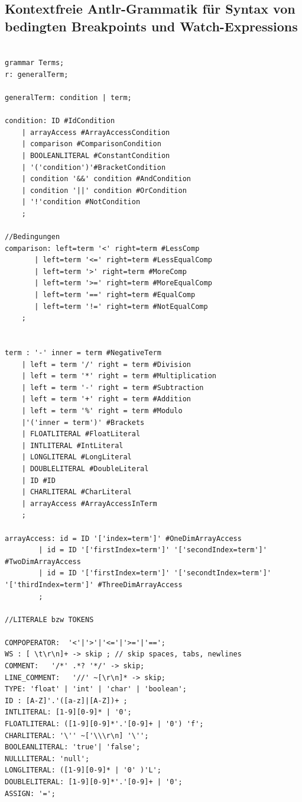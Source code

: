 \documentclass[parskip=full]{scrartcl}
\begin{document}
\subsection{Kontextfreie Antlr-Grammatik für Syntax von bedingten Breakpoints und Watch-Expressions}
\begin{verbatim}

grammar Terms;
r: generalTerm;

generalTerm: condition | term;

condition: ID #IdCondition
	| arrayAccess #ArrayAccessCondition
	| comparison #ComparisonCondition
	| BOOLEANLITERAL #ConstantCondition
	| '('condition')'#BracketCondition
	| condition '&&' condition #AndCondition
	| condition '||' condition #OrCondition
	| '!'condition #NotCondition
	;
	
//Bedingungen
comparison: left=term '<' right=term #LessComp
	   | left=term '<=' right=term #LessEqualComp
	   | left=term '>' right=term #MoreComp
	   | left=term '>=' right=term #MoreEqualComp
	   | left=term '==' right=term #EqualComp
	   | left=term '!=' right=term #NotEqualComp
	;


term : '-' inner = term #NegativeTerm
    | left = term '/' right = term #Division
	| left = term '*' right = term #Multiplication
	| left = term '-' right = term #Subtraction
	| left = term '+' right = term #Addition
	| left = term '%' right = term #Modulo
	|'('inner = term')' #Brackets
	| FLOATLITERAL #FloatLiteral
	| INTLITERAL #IntLiteral
	| LONGLITERAL #LongLiteral
	| DOUBLELITERAL #DoubleLiteral
	| ID #ID
	| CHARLITERAL #CharLiteral
	| arrayAccess #ArrayAccessInTerm
	;

arrayAccess: id = ID '['index=term']' #OneDimArrayAccess
		| id = ID '['firstIndex=term']' '['secondIndex=term']' #TwoDimArrayAccess
		| id = ID '['firstIndex=term']' '['secondtIndex=term']' '['thirdIndex=term']' #ThreeDimArrayAccess
		;

//LITERALE bzw TOKENS

COMPOPERATOR:  '<'|'>'|'<='|'>='|'==';
WS : [ \t\r\n]+ -> skip ; // skip spaces, tabs, newlines
COMMENT:   '/*' .*? '*/' -> skip;
LINE_COMMENT:   '//' ~[\r\n]* -> skip;
TYPE: 'float' | 'int' | 'char' | 'boolean';
ID : [A-Z]'.'([a-z]|[A-Z])+ ;
INTLITERAL: [1-9][0-9]* | '0';
FLOATLITERAL: ([1-9][0-9]*'.'[0-9]+ | '0') 'f';
CHARLITERAL: '\'' ~['\\\r\n] '\'';
BOOLEANLITERAL:	'true'|	'false';
NULLLITERAL: 'null';
LONGLITERAL: ([1-9][0-9]* | '0' )'L';
DOUBLELITERAL: [1-9][0-9]*'.'[0-9]+ | '0';
ASSIGN: '=';

\end{verbatim}
\end{document}
